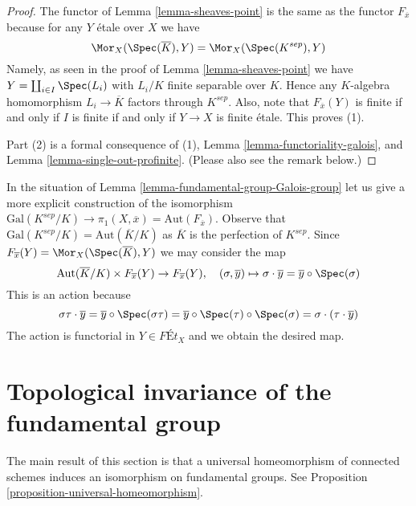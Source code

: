 \begin{proof}
The functor of Lemma \ref{lemma-sheaves-point} is the same as the functor
$F_{\overline{x}}$ because for any $Y$ \'etale over $X$ we have
$$
\Mor_X(\Spec(\overline{K}), Y) = \Mor_X(\Spec(K^{sep}), Y)
$$
Namely, as seen in the proof of Lemma \ref{lemma-sheaves-point} we have
$Y = \coprod_{i \in I} \Spec(L_i)$ with $L_i/K$ finite separable over $K$.
Hence any $K$-algebra homomorphism $L_i \to \overline{K}$ factors
through $K^{sep}$. Also, note that $F_{\overline{x}}(Y)$ is finite
if and only if $I$ is finite if and only if $Y \to X$ is finite \'etale.
This proves (1).

\medskip\noindent
Part (2) is a formal consequence of (1),
Lemma \ref{lemma-functoriality-galois}, and
Lemma \ref{lemma-single-out-profinite}.
(Please also see the remark below.)
\end{proof}

\begin{remark}
\label{remark-variance}
In the situation of Lemma \ref{lemma-fundamental-group-Galois-group}
let us give a more explicit construction of the isomorphism
$\text{Gal}(K^{sep}/K) \to
\pi_1(X, \overline{x}) = \text{Aut}(F_{\overline{x}})$.
Observe that
$\text{Gal}(K^{sep}/K) = \text{Aut}(\overline{K}/K)$
as $\overline{K}$ is the perfection of $K^{sep}$.
Since $F_{\overline{x}}(Y) = \Mor_X(\Spec(\overline{K}), Y)$
we may consider the map
$$
\text{Aut}(\overline{K}/K) \times F_{\overline{x}}(Y) \to F_{\overline{x}}(Y),
\quad
(\sigma, \overline{y}) \mapsto
\sigma \cdot \overline{y} = \overline{y} \circ \Spec(\sigma)
$$
This is an action because
$$
\sigma\tau \cdot \overline{y} =
\overline{y} \circ \Spec(\sigma\tau) =
\overline{y} \circ \Spec(\tau) \circ \Spec(\sigma) =
\sigma \cdot (\tau \cdot \overline{y})
$$
The action is functorial in $Y \in \textit{F\'Et}_X$ and we
obtain the desired map.
\end{remark}







\section{Topological invariance of the fundamental group}
\label{section-topological-invariance}

\noindent
The main result of this section is that a universal homeomorphism
of connected schemes induces an isomorphism on fundamental groups.
See Proposition \ref{proposition-universal-homeomorphism}.

